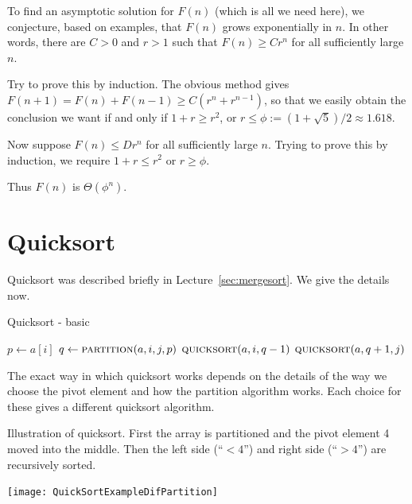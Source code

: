 To find an asymptotic solution for
$F(n)$ (which is all we need here), we conjecture, based on examples, that $F(n)$ grows
exponentially in $n$. In other words, there are $C > 0$ and $r > 1$ such that 
$F(n) \geq C r^n$ for all sufficiently large $n$.

Try to prove this by induction. The obvious method gives 
$F(n+1) = F(n) + F(n-1) \geq C(r^n + r^{n-1})$, so that we easily obtain
the conclusion we want if and only if $1 + r \geq r^2$, or $r \leq
\phi:=(1 + \sqrt{5})/2 \approx 1.618$. 

Now suppose $F(n) \leq D
r^n$ for all sufficiently large $n$. Trying to prove this by induction,
we require $1 + r \leq r^2$ or $r \geq \phi$. 

Thus $F(n)$ is $\Theta(\phi^n)$.



\chapter{Quicksort} %
\label{sec:quicksort}

Quicksort was described briefly in Lecture~\ref{sec:mergesort}. We give the details now.

\begin{algorithm}[H]
  \caption{Quicksort - basic}    
  \label{alg:quicksort}
\begin{algorithmic}[0]
			\State $p \gets a[i]$ 
			\State $q \gets  \Call{partition}{a, i,j,p}$ 
			\State $\Call{quicksort}{a,i,q-1}$ 
			\State $\Call{quicksort}{a,q+1,j}$ 
		\EndIf
	\EndFunction  
\end{algorithmic}
\end{algorithm}

The exact way in which quicksort works depends on the details of the way we choose the pivot element and how the 
partition algorithm works. Each choice for these gives a different quicksort algorithm.

\begin{Boxample} \label{ex:quicksortSmall}
Illustration of quicksort. First the array is partitioned and the pivot element 4 moved into the middle. 
Then the left side (``$< 4$'') and right side (``$> 4$'') are recursively sorted.
\begin{center}
  \texttt{[image: QuickSortExampleDifPartition]}
\end{center}
\end{Boxample}



